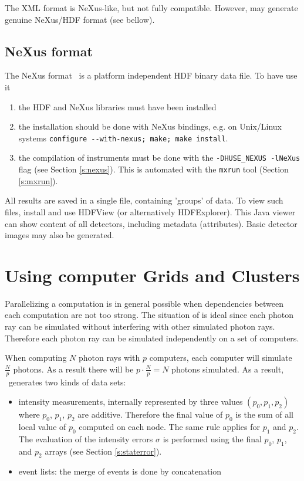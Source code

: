 The XML format is NeXus-like, but not fully compatible. However, \MCX may generate genuine NeXus/HDF format (see bellow).

\subsection{NeXus format}
  
\label{r:nexus}

The NeXus format~\cite{nexus_webpage} is a platform independent HDF binary data file. To have \MCX use it
\begin{enumerate}
\item the HDF and NeXus libraries must have been installed
\item the \MCX installation should be done with NeXus bindings, e.g. on Unix/Linux systems \verb+configure --with-nexus; make; make install+.
\item  the compilation of instruments must be done with the \verb+-DHUSE_NEXUS -lNeXus+ flag (see Section \ref{s:nexus}). This is automated with the \verb+mxrun+ tool (Section \ref{s:mxrun}).
\end{enumerate}
All results are saved in a single file, containing 'groups' of data. To view such files, install and use HDFView (or alternatively HDFExplorer). This Java viewer can show content of all detectors, including metadata (attributes). Basic detector images may also be generated.

\section{Using computer Grids and Clusters}
\label{s:run-mpi}

Parallelizing a computation is in general possible when dependencies between
  each computation are not too strong. The situation of \MCX is
  ideal since each photon ray can be simulated without interfering with
  other simulated photon rays. Therefore each photon ray can be simulated
  independently on a set of computers.
  
When computing $N$ photon rays with
$p$ computers, each computer will simulate $\frac{N}{p}$
photons. As a result there will be $p \cdot \frac{N}{p} = N$
photons simulated. As a result, \MCX\ generates two kinds of data sets:
\begin{itemize}
\item intensity measurements, internally represented by three
  values $(p_0, p_1, p_2)$ where $p_0$, $p_1$, $p_2$ are
  additive. Therefore the final value of $p_0$ is the sum of all
  local value of  $p_0$ computed on each node. The same rule applies
  for $p_1$ and $p_2$. The evaluation of the intensity errors $\sigma$
  is performed using the final $p_0$, $p_1$, and $p_2$ arrays (see Section \ref{s:staterror}).
\item event lists: the merge of events is done by concatenation
\end{itemize}

